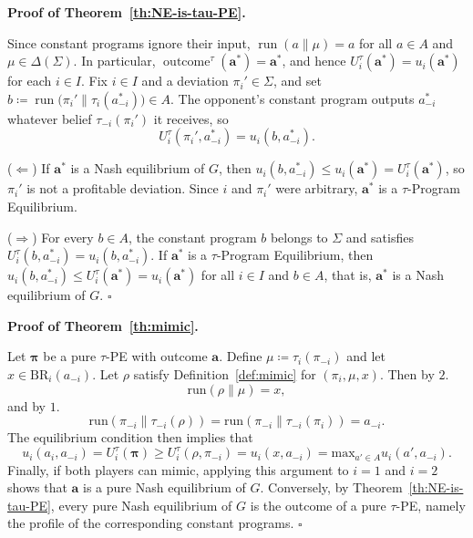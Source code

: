 \documentclass[twoside,11pt]{article}
\renewcommand{\BlackBox}{\ensuremath{\square}}
\renewenvironment{proof}[1][Proof]{%
  \par\noindent\textbf{#1.}\enspace\ignorespaces
}{%
  \ifhmode\unskip\nobreak\hfill\quad\else\noindent\hfill\fi
  \BlackBox\par\addvspace{2mm}%
}
\begin{document}
\begin{proof}[Proof of Theorem~\ref{th:NE-is-tau-PE}]
Since constant programs ignore their input, $\operatorname{run}(a \| \mu) = a$ for all $a \in A$ and $\mu \in \Delta(\Sigma)$. In particular, $\operatorname{outcome}^\tau(\bm{a}^*) = \bm{a}^*$, and hence $U_i^\tau(\bm{a}^*) = u_i(\bm{a}^*)$ for each $i \in I$. Fix $i \in I$ and a deviation $\pi_i' \in \Sigma$, and set $b \coloneqq \operatorname{run}\bigl(\pi_i' \mathrel{\|} \tau_i(a_{-i}^*)\bigr) \in A$. The opponent's constant program outputs $a_{-i}^*$ whatever belief $\tau_{-i}(\pi_i')$ it receives, so
\begin{equation*}
  U_i^\tau(\pi_i', a_{-i}^*) = u_i(b, a_{-i}^*).
\end{equation*}

($\Leftarrow$) If $\bm{a}^*$ is a Nash equilibrium of $G$, then $u_i(b, a_{-i}^*) \le u_i(\bm{a}^*) = U_i^\tau(\bm{a}^*)$, so $\pi_i'$ is not a profitable deviation. Since $i$ and $\pi_i'$ were arbitrary, $\bm{a}^*$ is a $\tau$-Program Equilibrium.

($\Rightarrow$) For every $b \in A$, the constant program $b$ belongs to $\Sigma$ and satisfies $U_i^\tau(b, a_{-i}^*) = u_i(b, a_{-i}^*)$. If $\bm{a}^*$ is a $\tau$-Program Equilibrium, then $u_i(b, a_{-i}^*) \le U_i^\tau(\bm{a}^*) = u_i(\bm{a}^*)$ for all $i \in I$ and $b \in A$, that is, $\bm{a}^*$ is a Nash equilibrium of $G$.
\end{proof}

\begin{proof}[Proof of Theorem~\ref{th:mimic}]
    Let $\bm{\pi}$ be a pure $\tau$-PE with outcome $\bm{a}$. Define $\mu \coloneq \tau_i(\pi_{-i})$ and let $x \in \mathrm{BR}_i(a_{-i})$. Let $\rho$ satisfy Definition~\ref{def:mimic} for $(\pi_i, \mu, x)$. Then by $2.$
    \begin{equation*}
        \mathrm{run}(\rho \| \mu) = x,
    \end{equation*}
    and by $1.$
    \begin{equation*}
         \mathrm{run}(\pi_{-i} \| \tau_{-i}(\rho)) = \mathrm{run}(\pi_{-i} \| \tau_{-i}(\pi_{i})) = a_{-i}.
    \end{equation*}
    The equilibrium condition then implies that
    \begin{equation*}
        u_i(a_i, a_{-i}) = U_i^\tau(\bm{\pi}) \ge U_i^\tau(\rho, \pi_{-i}) = u_i(x, a_{-i}) = \mathrm{max}_{a' \in A}u_i(a', a_{-i}).
    \end{equation*}
    Finally, if both players can mimic, applying this argument to $i = 1$ and $i = 2$ shows that $\bm{a}$ is a pure Nash equilibrium of $G$. Conversely, by Theorem~\ref{th:NE-is-tau-PE}, every pure Nash equilibrium of $G$ is the outcome of a pure $\tau$-PE, namely the profile of the corresponding constant programs.
\end{proof}
\end{document}
